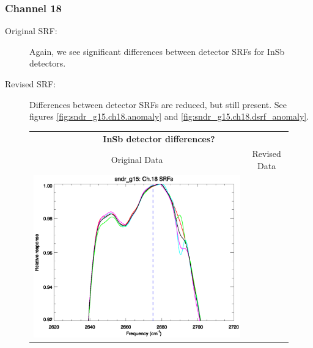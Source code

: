 \subsubsection{Channel 18}
\begin{description}
  \item[Original SRF:] Again, we see significant differences between detector SRFs for InSb detectors.
  \item[Revised SRF:]  Differences between detector SRFs are reduced, but still present. See figures \ref{fig:sndr_g15.ch18.anomaly} and \ref{fig:sndr_g15.ch18.dsrf_anomaly}.
\end{description}

\begin{figure}[htp]
  \centering
  \begin{tabular}{c c}
    \multicolumn{2}{c}{\textsf{\bfseries InSb detector differences?}} \\
    \hspace{1.5em}\textsf{Original Data} &
    \hspace{1.5em}\textsf{Revised Data} \\
    \includegraphics[scale=0.5,trim=0 40 0 0]{graphics/zoom_anomaly/original/sndr_g15.ch18.srf.eps} &

\end{tabular}
\end{figure}
